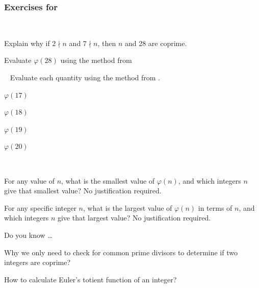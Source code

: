 
\subsubsection*{Exercises for  \subcoprime}

\begin{exer}[\exerP] %
\label{exer_euler_phi28}
~
    \begin{exerpart}       
        \item Explain why if $2 \nmid n$ and $7 \nmid n$, then $n$ and 28 are coprime.
        \item Evaluate $\varphi(28)$ using the method from 
    \end{exerpart}
\end{exer}

\begin{exer}[\exerP] %
\label{exer_euler_phi17181920}
~ 
   Evaluate each quantity using the method from .
    \begin{exerpart}
        \item $\varphi(17)$
        \item $\varphi(18)$
        \item $\varphi(19)$
        \item $\varphi(20)$
    \end{exerpart}
\end{exer}

\begin{exer}[\exerU] %
\label{exer_extreme_phi}
~
    \begin{exerpart}
        \item For any value of $n$, what is the smallest value of $\varphi(n)$, and which integers $n$ give that smallest value?  No justification required.

        \item For any specific integer $n$, what is the largest value of $\varphi(n)$ in terms of $n$, and which integers $n$ give that largest value?  No justification required.    
    \end{exerpart}
\end{exer}

\begin{exer}[\exerR] %
\label{exer_dyk_coprime}
    Do you know \ldots
        \begin{exerpart}
            \item Why we only need to check for common prime divisors to determine if two integers are coprime?
            \item How to calculate Euler's totient function of an integer? 
        \end{exerpart}
\end{exer}

